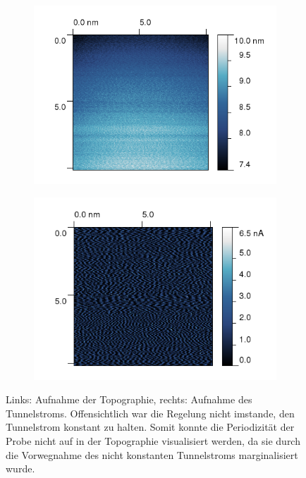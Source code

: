 \begin{figure}[h]
    \begin{subfigure}[b]{\picwidth}
    \includegraphics[width=\textwidth]{pics/fehler1a}
    \end{subfigure}\qquad
    \begin{subfigure}[b]{\picwidth}
        \includegraphics[width=\textwidth]{pics/fehler1b}
    \end{subfigure}
    \caption{Links: Aufnahme der Topographie, rechts: Aufnahme des Tunnelstroms.
    Offensichtlich war die Regelung nicht imstande, den Tunnelstrom konstant zu halten. 
    Somit konnte die Periodizität der Probe nicht auf in der Topographie visualisiert werden,
    da sie durch die Vorwegnahme des nicht konstanten Tunnelstroms marginalisiert wurde.}
    \label{fig:fehler1}
\end{figure}

